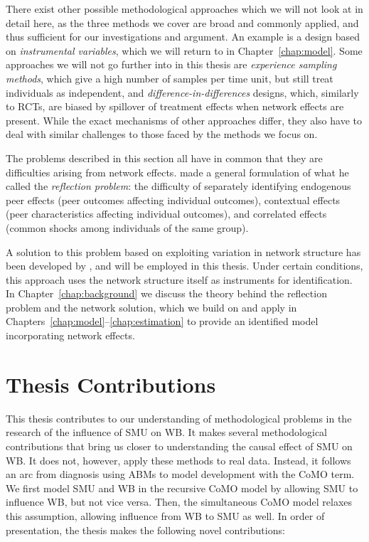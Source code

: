 There exist other possible methodological approaches which we will not look at in detail here, as the three methods we cover are broad and commonly applied, and thus sufficient for our investigations and argument. An example is a design based on \emph{instrumental variables}, which we will return to in Chapter~\ref{chap:model}. Some approaches we will not go further into in this thesis are \emph{experience sampling methods}, which give a high number of samples per time unit, but still treat individuals as independent, and \emph{difference-in-differences} designs, which, similarly to RCTs, are biased by spillover of treatment effects when network effects are present. While the exact mechanisms of other approaches differ, they also have to deal with similar challenges to those faced by the methods we focus on.

The problems described in this section all have in common that they are difficulties arising from network effects. \textcite[Sec.~2]{Manski1993} made a general formulation of what he called the \emph{reflection problem}: the difficulty of separately identifying endogenous peer effects (peer outcomes affecting individual outcomes), contextual effects (peer characteristics affecting individual outcomes), and correlated effects (common shocks among individuals of the same group).

A solution to this problem based on exploiting variation in network structure has been developed by \textcite{Bramoulle2009}, and will be employed in this thesis. Under certain conditions, this approach uses the network structure itself as instruments for identification. In Chapter~\ref{chap:background} we discuss the theory behind the reflection problem and the network solution, which we build on and apply in Chapters~\ref{chap:model}--\ref{chap:estimation} to provide an identified model incorporating network effects.

\section{Thesis Contributions}
\label{sec:intro:contributions}
This thesis contributes to our understanding of methodological problems in the research of the influence of SMU on WB\@. It makes several methodological contributions that bring us closer to understanding the causal effect of SMU on WB\@. It does not, however, apply these methods to real data. Instead, it follows an arc from diagnosis using ABMs to model development with the CoMO term. We first model SMU and WB in the recursive CoMO model by allowing SMU to influence WB, but not vice versa. Then, the simultaneous CoMO model relaxes this assumption, allowing influence from WB to SMU as well. In order of presentation, the thesis makes the following novel contributions:


